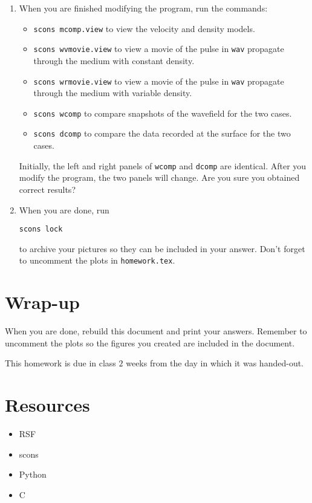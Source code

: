 \begin{enumerate}
\item
When you are finished modifying the program, run the commands:

\begin{itemize}

\item \texttt{scons mcomp.view} to view the velocity and density models.

\item \texttt{scons wvmovie.view} to view a movie of the pulse in
\texttt{wav} propagate through the medium with constant density.

\item \texttt{scons wrmovie.view} to view a movie of the pulse in
\texttt{wav} propagate through the medium with variable density.

\item \texttt{scons wcomp} to compare snapshots of the wavefield
for the two cases.

\item \texttt{scons dcomp} to compare the data recorded at the surface
for the two cases.

\end{itemize}

Initially, the left and right panels of \texttt{wcomp} and 
\texttt{dcomp} are identical. After you modify the program, the 
two panels will change. Are you sure you obtained correct results?

\item When you are done, run
\par \texttt{scons lock}
\par to archive your pictures so they can be included in your answer.
Don't forget to uncomment the plots in \texttt{homework.tex}.

\end{enumerate}



\section{Wrap-up}

When you are done, rebuild this document and 
print your answers. Remember to uncomment the plots
so the figures you created are included in the document.

This homework is due in class $2$ weeks
from the day in which it was handed-out.


\section{Resources}

\begin{itemize}
\item RSF
\item scons
\item Python
\item C
\end{itemize}
